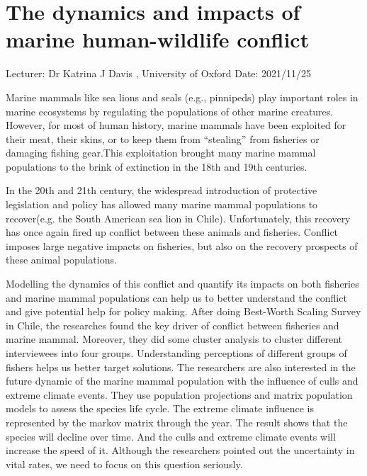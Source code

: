 \documentclass[11pt]{article}
\begin{document}
    
    
\newpage
  
    
    
    
\linenumbers
\section{The dynamics and impacts of marine human-wildlife conflict}
Lecturer: Dr Katrina J Davis , University of Oxford
\newline
Date: 2021/11/25
\newline

Marine mammals like sea lions and seals (e.g., pinnipeds) play important roles in marine ecosystems by regulating the populations of other marine creatures. However, for most of human history, marine mammals have been exploited for their meat, their skins, or to keep them from “stealing” from fisheries or damaging fishing gear.This exploitation brought many marine mammal populations to the brink of extinction in the 18th and 19th centuries.

In the 20th and 21th century, the widespread introduction of protective legislation and policy has allowed many marine mammal populations to recover(e.g. the South American sea lion in Chile). Unfortunately, this recovery has once again fired up conflict between these animals and fisheries. Conflict imposes large negative impacts on fisheries, but also on the recovery prospects of these animal populations. 

Modelling the dynamics of this conflict and quantify its impacts on both fisheries and marine mammal populations can help us to better understand the conflict and give potential help for policy making. After doing Best-Worth Scaling Survey in Chile, the researches found the key driver of conflict between fisheries and marine mammal. Moreover, they did some cluster analysis to cluster different interviewees into four groups. Understanding perceptions of different groups of fishers helps us better target solutions. The researchers are also interested in the future dynamic of the marine mammal population with the influence of culls and extreme climate events. They use population projections and matrix population models to assess the species life cycle. The extreme climate influence is represented by the markov matrix through the year. The result shows that the species will decline over time. And the culls and extreme climate events will increase the speed of it. Although the researchers pointed out the uncertainty in vital rates, we need to focus on this question seriously.
\end{document}
